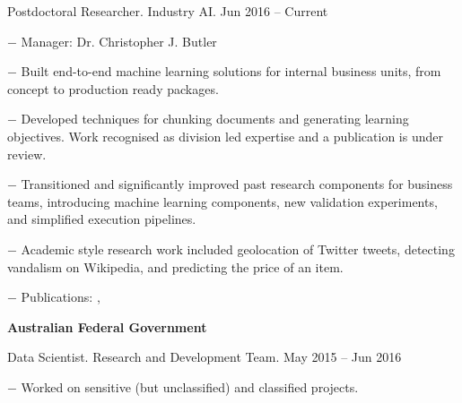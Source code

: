 \documentclass[10pt]{article}
\newcommand{\halfblankline}{\quad\vspace{-0.5\baselineskip}\pagebreak[3]}
\begin{document}
\begin{innerlist}
	\item Postdoctoral Researcher. Industry AI. \hfill {Jun 2016 -- Current}
	\begin{innerlist}
		\item[$-$] Manager: Dr. Christopher J. Butler
		\item[$-$] Built end-to-end machine learning solutions for internal business units, from concept to production ready packages.
		\item[$-$] Developed techniques for chunking documents and generating learning objectives. Work recognised as division led expertise and a publication is under review.
		\item[$-$] Transitioned and significantly improved past research components for business teams, introducing machine learning components, new validation experiments, and simplified execution pipelines.
		\item[$-$] Academic style research work included geolocation of Twitter tweets, detecting vandalism on Wikipedia, and predicting the price of an item.
		\item[$-$] Publications: \cite{Lau2017}, \cite{Tran2018}
    \end{innerlist}
\end{innerlist}

		
\halfblankline

\halfblankline

\textbf{Australian Federal Government}

\halfblankline

\begin{innerlist}
	\item Data Scientist. Research and Development Team. \hfill {May 2015 -- Jun 2016}
	\begin{innerlist}
		\item[$-$] Worked on sensitive (but unclassified) and classified projects.
    \end{innerlist}
\end{innerlist}
\end{document}
